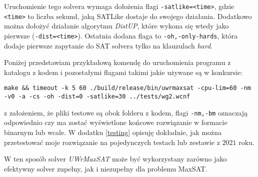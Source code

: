 \documentclass[shortabstract]{iithesis}
\begin{document}
Uruchomienie tego solvera wymaga dołożenia flagi \texttt{-satlike=<time>}, gdzie \texttt{<time>} to liczba sekund, jaką SATLike dostaje do swojego działania. Dodatkowo można dołożyć działanie algorytmu \textit{DistUP}, które wykona się wtedy jako pierwsze (\texttt{-dist=<time>}). Ostatnia dodana flaga to \texttt{-oh,-only-hards}, która dodaje pierwsze zapytanie do SAT solvera tylko na klauzulach \textit{hard}.

Poniżej przedstawiam przykładową komendę do uruchomienia programu z katalogu z kodem i pozostałymi flagami takimi jakie używane są w konkursie:
	
\texttt{make \&\& timeout -k 5 60 ./build/release/bin/uwrmaxsat -cpu-lim=60 -nm -v0 -a -cs -oh -dist=0 -satlike=30 ../tests/wg2.wcnf} 

z założeniem, że pliki testowe są  obok folderu z kodem, flagi \texttt{-nm,-bm} oznaczają 
odpowiednio czy ma zostać wyświetlone końcowe rozwiązanie w formacie binarnym lub wcale.
W dodatku \ref{testing} opisuję dokładnie, jak można przetestować moje rozwiązanie na pojedynczych testach lub zestawie z $2021$ roku.

W ten sposób solver \textit{UWrMaxSAT} może być wykorzystany zarówno jako efektywny solver zupełny, jak i niezupełny dla problemu MaxSAT.

\appendix
\end{document}
